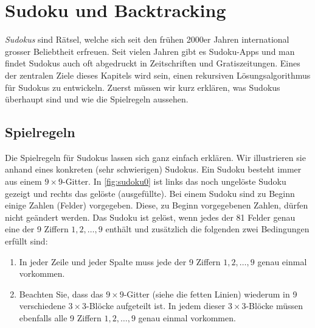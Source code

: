 \chapter{Sudoku und Backtracking}\label{ch:Kapitel06}
\textit{Sudokus} sind Rätsel, welche sich seit den frühen 2000er Jahren international grosser Beliebtheit erfreuen. Seit vielen Jahren gibt es Sudoku-Apps und man findet Sudokus auch oft abgedruckt in Zeitschriften und Gratiszeitungen. Eines der zentralen Ziele dieses Kapitels wird sein, einen rekursiven Lösungsalgorithmus für Sudokus zu entwickeln. Zuerst müssen wir kurz erklären, was Sudokus überhaupt sind und wie die Spielregeln aussehen.

\section{Spielregeln}
Die Spielregeln für Sudokus lassen sich ganz einfach erklären. Wir illustrieren sie anhand eines konkreten (sehr schwierigen) Sudokus. Ein Sudoku besteht immer aus einem $9\times 9$-Gitter. In \cref{fig:sudoku0} ist links das noch ungelöste Sudoku gezeigt und rechts das gelöste (ausgefüllte). Bei einem Sudoku sind zu Beginn einige Zahlen (Felder) vorgegeben. Diese, zu Beginn vorgegebenen Zahlen, dürfen nicht geändert werden. Das Sudoku ist gelöst, wenn jedes der 81 Felder genau eine der 9 Ziffern $1,2,\ldots, 9$ enthält und zusätzlich die folgenden zwei Bedingungen erfüllt sind:
\begin{enumerate}
	\item In jeder Zeile und jeder Spalte muss jede der 9 Ziffern $1,2,\ldots, 9$ genau einmal vorkommen.
	\item Beachten Sie, dass das $9\times 9$-Gitter (siehe die fetten Linien) wiederum in 9 verschiedene $3\times 3$-Blöcke aufgeteilt ist. In jedem dieser $3\times 3$-Blöcke müssen ebenfalls alle 9 Ziffern $1,2,\ldots, 9$ genau einmal vorkommen.
\end{enumerate}

